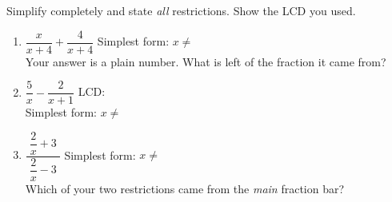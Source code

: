 \documentclass[10pt]{article}
\begin{document}
\begin{practicebox}
Simplify completely and state \emph{all} restrictions. Show the LCD you used.

\vspace{3pt}
\begin{enumerate}[leftmargin=1.7em, itemsep=8pt]
  \item $\dfrac{x}{x+4}+\dfrac{4}{x+4}$ \hfill Simplest form: \blank{2.0cm} \quad
        $x\neq$ \blank{1.4cm} \\[3pt]
        Your answer is a plain number. What is left of the fraction it came from? \blank{4.6cm}
  \item $\dfrac{5}{x}-\dfrac{2}{x+1}$ \hfill LCD: \blank{2.4cm} \\[4pt]
        Simplest form: \blank{2.6cm} \quad $x\neq$ \blank{2.0cm}
  \item $\dfrac{\;\dfrac{2}{x}+3\;}{\;\dfrac{2}{x}-3\;}$ \hfill Simplest form: \blank{2.4cm} \quad
        $x\neq$ \blank{2.2cm} \\[3pt]
        Which of your two restrictions came from the \emph{main} fraction bar? \blank{2.0cm}
\end{enumerate}
\end{practicebox}
\end{document}
